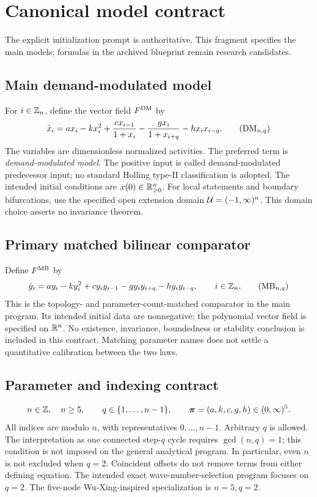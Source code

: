 \section{Canonical model contract}
\label{sec:canonical}
The explicit initialization prompt is authoritative. This fragment specifies
the main models; formulas in the archived blueprint remain research candidates.

\subsection{Main demand-modulated model}
For $i\in\mathbb{Z}_n$, define the vector field $F^{\mathrm{DM}}$ by
\begin{equation}
\label{eq:canonical-dm}
\dot{x}_i=a x_i-kx_i^2+\frac{c x_{i-1}}{1+x_i}
             -\frac{g x_i}{1+x_{i+q}}-h x_i x_{i-q}.
\tag{$\DM_{n,q}$}
\end{equation}
The variables are dimensionless normalized activities. The preferred term is
\emph{demand-modulated model}. The positive input is called demand-modulated
predecessor input; no standard Holling type-II classification is adopted.
The intended initial conditions are $x(0)\in\mathbb{R}_{\geq 0}^{n}$. For local statements and
boundary bifurcations, use the specified open extension domain
$\mathcal{U}=(-1,\infty)^n$. This domain choice asserts no invariance theorem.

\subsection{Primary matched bilinear comparator}
Define $F^{\mathrm{MB}}$ by
\begin{equation}
\label{eq:canonical-mb}
\dot{y}_i=a y_i-k y_i^2+c y_i y_{i-1}
                 -g y_i y_{i+q}-h y_i y_{i-q},\qquad i\in\Zn.
\tag{$\MB_{n,q}$}
\end{equation}
This is the topology- and parameter-count-matched comparator in the main
program. Its intended initial data are nonnegative; the polynomial vector
field is specified on $\mathbb{R}^n$. No existence, invariance, boundedness or
stability conclusion is included in this contract. Matching parameter names
does not settle a quantitative calibration between the two laws.

\subsection{Parameter and indexing contract}
\[
n\in\mathbb{Z},\quad n\geq5,\qquad q\in\{1,\ldots,n-1\},\qquad
\boldsymbol{\pi}=(a,k,c,g,h)\in(0,\infty)^5.
\]
All indices are modulo $n$, with representatives $0,\ldots,n-1$.
Arbitrary $q$ is allowed. The interpretation as one connected step-$q$ cycle
requires $\gcd(n,q)=1$; this condition is not imposed on the general analytical
program. In particular, even $n$ is not excluded when $q=2$. Coincident offsets
do not remove terms from either defining equation.
The intended exact wave-number-selection program focuses on $q=2$.
The five-node Wu-Xing-inspired specialization is $n=5,q=2$.

